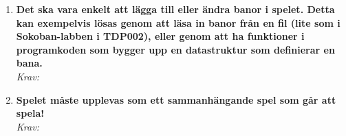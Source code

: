 \documentclass[12pt]{TDP005mall}
\begin{document}
\begin{enumerate}
    \clearpage
    
    \item \textbf{Det ska vara enkelt att lägga till eller ändra banor i spelet. Detta kan exempelvis lösas genom att läsa in banor från en fil (lite som i Sokoban-labben i TDP002), eller genom att ha funktioner i programkoden som bygger upp en datastruktur som definierar en bana.} \\ \emph{Krav: }
    
    \item \textbf{Spelet måste upplevas som ett sammanhängande spel som går att spela!} \\ \emph{Krav:}
\end{enumerate}
\end{document}
